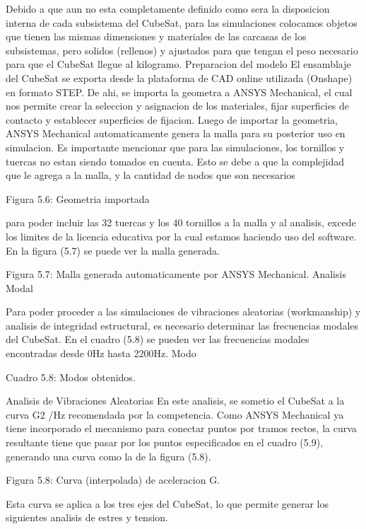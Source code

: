     Debido a que aun no esta completamente definido como sera la disposicion interna de
    cada subsistema del CubeSat, para las simulaciones colocamos objetos que tienen las mismas
    dimensiones y materiales de las carcasas de los subsistemas, pero solidos (rellenos) y ajustados
    para que tengan el peso necesario para que el CubeSat llegue al kilogramo.
    Preparacion del modelo
    El ensamblaje del CubeSat se exporta desde la plataforma de CAD online utilizada (Onshape) en formato
    STEP. De ahi, se importa la geometra a ANSYS Mechanical, el cual nos permite crear la seleccion
    y asignacion de los materiales, fijar superficies de contacto y
    establecer superficies de fijacion. Luego de importar la geometria, ANSYS Mechanical
    automaticamente genera la malla para su posterior uso en simulacion.
    Es importante mencionar que para las simulaciones, los
    tornillos y tuercas no estan siendo tomados en cuenta. Esto se debe a que la complejidad que le agrega
    a la malla, y la cantidad de nodos que son necesarios

    Figura 5.6: Geometria importada

    para poder incluir las 32 tuercas y los 40 tornillos a
    la malla y al analisis, excede los limites de la licencia
    educativa por la cual estamos haciendo uso del software. En la figura (5.7) se puede ver la
    malla generada.

    Figura 5.7: Malla generada automaticamente por ANSYS Mechanical.
    Analisis Modal

    Para poder proceder a las simulaciones de vibraciones aleatorias (workmanship) y analisis
    de integridad estructural, es necesario determinar las frecuencias modales del CubeSat. En
    el cuadro (5.8) se pueden ver las frecuencias modales encontradas desde 0Hz hasta 2200Hz.
    Modo


    Cuadro 5.8: Modos obtenidos.

    Analisis de Vibraciones Aleatorias
    En este analisis, se sometio el CubeSat a la curva G2 /Hz recomendada por la competencia. Como ANSYS Mechanical ya tiene incorporado el mecanismo para conectar puntos por
    tramos rectos, la curva resultante tiene que pasar por los puntos especificados en el cuadro
    (5.9), generando una curva como la de la figura (5.8).


    Figura 5.8: Curva (interpolada) de aceleracion G.

    Esta curva se aplica a los tres ejes del CubeSat, lo que permite generar los siguientes
    analisis de estres y tension.

